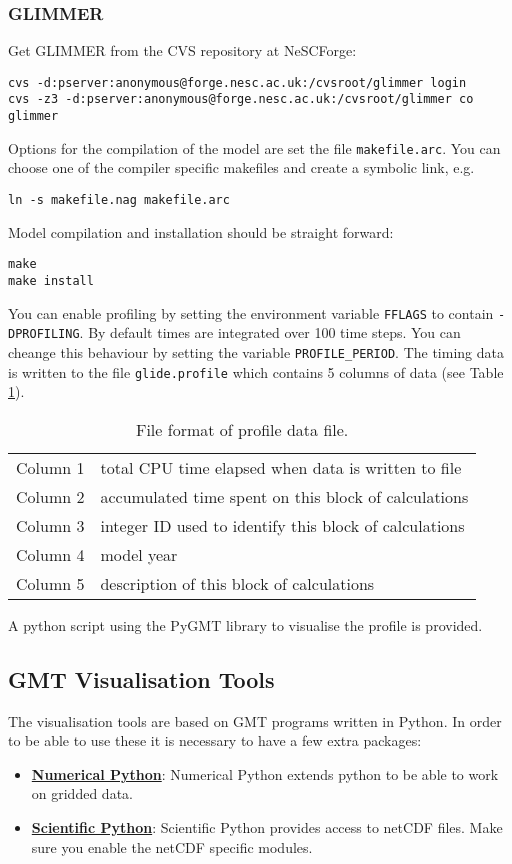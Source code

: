 \subsubsection{GLIMMER}
Get GLIMMER from the CVS repository at NeSCForge:
{\small
\begin{verbatim}
cvs -d:pserver:anonymous@forge.nesc.ac.uk:/cvsroot/glimmer login
cvs -z3 -d:pserver:anonymous@forge.nesc.ac.uk:/cvsroot/glimmer co glimmer
\end{verbatim}}

Options for the compilation of the model are set the file \texttt{makefile.arc}. You can choose one of the compiler specific makefiles and create a symbolic link, e.g.
{\small
\begin{verbatim}
ln -s makefile.nag makefile.arc
\end{verbatim}}
Model compilation and installation should be straight forward:
{\small
\begin{verbatim}
make
make install
\end{verbatim}}

You can enable profiling by setting the environment variable \texttt{FFLAGS} to contain \texttt{-DPROFILING}. By default times are integrated over 100 time steps. You can cheange this behaviour by setting the variable \texttt{PROFILE\_PERIOD}. The timing data is written to the file \texttt{glide.profile} which contains 5 columns of data (see Table \ref{ug.tab.profile_format}).
\begin{table}[htbp]
  \centering
  \begin{tabular}{|l|l|}
    \hline
    Column 1 &total CPU time elapsed when data is written to file\\
    Column 2 &accumulated time spent on this block of calculations\\
    Column 3 &integer ID used to identify this block of calculations\\
    Column 4 &model year\\
    Column 5 &description of this block of calculations\\
    \hline
  \end{tabular}
  \caption{File format of profile data file.}
  \label{ug.tab.profile_format}
\end{table}
A python script using the PyGMT library to visualise the profile is provided.

\subsection{GMT Visualisation Tools}
The visualisation tools are based on GMT programs written in Python. In order to be able to use these it is necessary to have a few extra packages:
\begin{itemize}
\item \href{http://www.pfdubois.com/numpy/}{{\bf Numerical Python}}: Numerical Python extends python to be able to work on gridded data.
\item \href{http://starship.python.net/~hinsen/ScientificPython/}{{\bf Scientific Python}}: Scientific Python provides access to netCDF files. Make sure you enable the netCDF specific modules.
\end{itemize}

